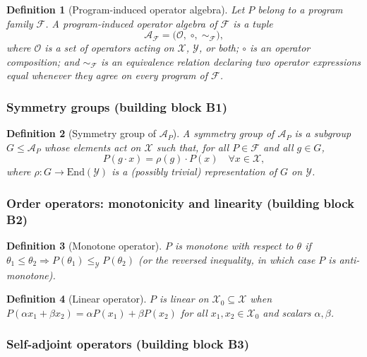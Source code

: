\documentclass[acmsmall, screen]{acmart}
\newtheorem{definition}{Definition}
\begin{document}
\begin{definition}[Program-induced operator algebra]
Let $P$ belong to a program family $\mathcal{F}$. A \emph{program-induced operator algebra} of $\mathcal{F}$ is a tuple
$$\mathcal{A}_{\mathcal{F}} = \bigl(\mathcal{O}, \;\circ, \;\sim_{\mathcal{F}}\bigr),$$
where $\mathcal{O}$ is a set of operators acting on $\mathcal{X}$, $\mathcal{Y}$, or both; $\circ$ is an operator composition; and $\sim_{\mathcal{F}}$ is an equivalence relation declaring two operator expressions equal whenever they agree on every program of $\mathcal{F}$.
\end{definition}

\subsubsection{Symmetry groups (building block B1)}

\begin{definition}[Symmetry group of $\mathcal{A}_P$]
A \emph{symmetry group} of $\mathcal{A}_P$ is a subgroup $G \le \mathcal{A}_P$ whose elements act on $\mathcal{X}$ such that, for all $P \in \mathcal{F}$ and all $g \in G$,
$$P(g \cdot x) = \rho(g) \cdot P(x) \quad \forall x \in \mathcal{X},$$
where $\rho: G \to \mathrm{End}(\mathcal{Y})$ is a (possibly trivial) representation of $G$ on $\mathcal{Y}$.
\end{definition}

\subsubsection{Order operators: monotonicity and linearity (building block B2)}

\begin{definition}[Monotone operator]
$P$ is \emph{monotone with respect to} $\theta$ if $\theta_1 \le \theta_2 \Rightarrow P(\theta_1) \le_{\mathcal{Y}} P(\theta_2)$ (or the reversed inequality, in which case $P$ is \emph{anti-monotone}).
\end{definition}

\begin{definition}[Linear operator]
$P$ is \emph{linear} on $\mathcal{X}_0 \subseteq \mathcal{X}$ when $P(\alpha x_1 + \beta x_2) = \alpha P(x_1) + \beta P(x_2)$ for all $x_1, x_2 \in \mathcal{X}_0$ and scalars $\alpha, \beta$.
\end{definition}

\subsubsection{Self-adjoint operators (building block B3)}
\end{document}
